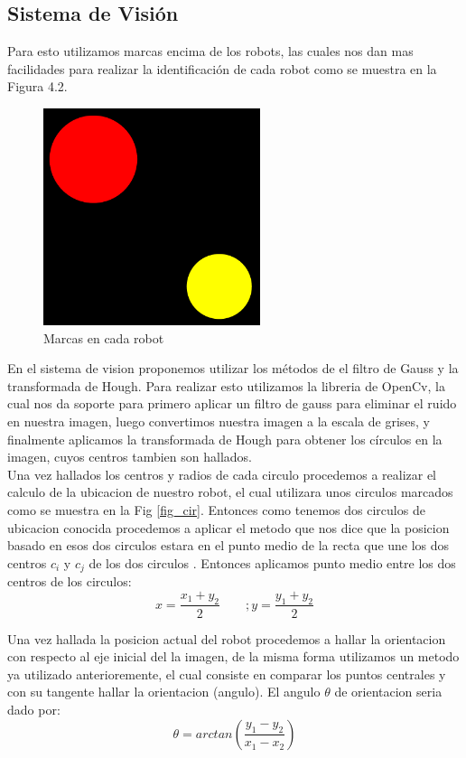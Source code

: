 \documentclass[conference]{IEEEtran}
\begin{document}
\subsection{Sistema de Visi\'on}
Para esto utilizamos marcas encima de los robots, las cuales nos dan mas facilidades para realizar la identificaci\'on de cada robot como se muestra en la Figura 4.2.
	\begin{figure}
	\centering
	\includegraphics[width=2.5in]{imagen1.pdf}
	
	\caption{Marcas en cada robot}
	\label{fig_mar}
\end{figure}
En el sistema de vision proponemos utilizar los m\'etodos de el filtro de Gauss y la transformada de Hough. Para realizar esto utilizamos la libreria de OpenCv, la cual nos da soporte para primero aplicar un filtro de gauss para eliminar el ruido en nuestra imagen, luego convertimos nuestra imagen a la escala de grises, y finalmente aplicamos la transformada de Hough para obtener los c\'irculos en la imagen, cuyos centros tambien son hallados.\\
Una vez hallados los centros y radios de cada circulo procedemos a realizar el calculo de la ubicacion de nuestro robot, el cual utilizara unos circulos marcados como se muestra en la Fig  \ref{fig_cir}. Entonces como tenemos dos circulos de ubicacion conocida procedemos a aplicar el metodo  que nos dice que la posicion basado en esos dos circulos estara en el punto medio de la recta que une los dos centros  $c_i$ y $c_j$ de los dos circulos \cite{kelson_glo}. Entonces aplicamos punto medio entre los dos centros de los circulos:
\begin{equation}
x=\frac{x_1+y_2}{2} \qquad; y=\frac{y_1+y_2}{{2}}
\end{equation}

Una vez hallada la posicion actual del robot procedemos a hallar la orientacion con respecto al eje inicial del la imagen, de la misma forma utilizamos un metodo ya utilizado anterioremente,  el cual consiste en comparar los puntos centrales y con su tangente hallar la orientacion (angulo)\cite{kelson_glo}. El angulo $\theta$ de orientacion seria dado por:
\begin{equation}
\theta=arctan(\frac{y_1-y_2}{x_1-x_2} )
\end{equation}
\end{document}
